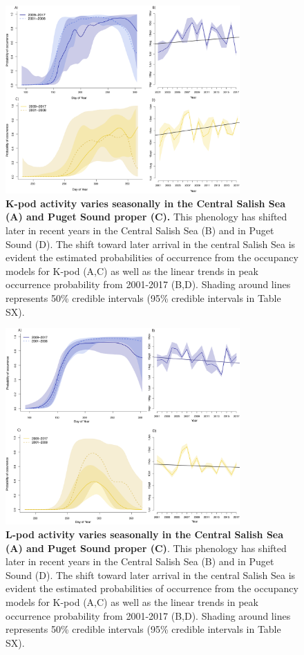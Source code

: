 \documentclass{article}
\begin{document}
\begin{figure}[p]
\includegraphics[width=0.8\textwidth]{../analyses/figures/proboccK_4panels.png} 
\caption{\textbf{K-pod activity varies seasonally in the Central Salish Sea (A) and Puget Sound proper (C).} This phenology has shifted later in recent years in the Central Salish Sea (B) and in Puget Sound (D). The shift toward later arrival in the central Salish Sea is evident the estimated probabilities of occurrence from the occupancy models for K-pod (A,C) as well as the linear trends in peak occurrence probability from 2001-2017 (B,D). Shading around lines represents 50\% credible intervals (95\% credible intervals in Table SX). 
}
\label{fig:Kprobs}
\end{figure}


\begin{figure}[p]
\includegraphics[width=0.8\textwidth]{../analyses/figures/proboccL_4panels.png} 
\caption{\textbf{L-pod activity varies seasonally in the Central Salish Sea (A) and Puget Sound proper (C)}. This phenology has shifted later in recent years in the Central Salish Sea (B) and in Puget Sound (D). The shift toward later arrival in the central Salish Sea is evident the estimated probabilities of occurrence from the occupancy models for K-pod (A,C) as well as the linear trends in peak occurrence probability from 2001-2017 (B,D). Shading around lines represents 50\% credible intervals (95\% credible intervals in Table SX). 
}
\label{fig:Lprobs}
\end{figure}
\end{document}
